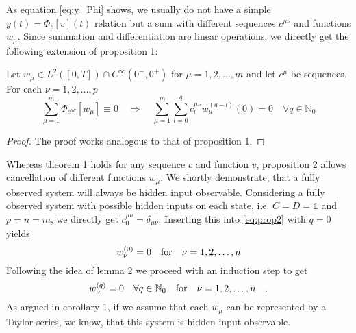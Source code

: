 \clearpage
As equation \eqref{eq:y_Phi} shows, we usually do not have a simple $y(t)=\Phi_c[v](t)$ 
relation but a sum with different sequences $c^{\mu\nu}$ and functions $w_\mu$. Since 
summation and differentiation are linear operations, we directly get the following 
extension of proposition 1:
\begin{proposition}{}{}
	Let $w_\mu\in L^2([0,T])\cap C^\infty(0^-,0^+)$ for $\mu=1,2,\ldots , m$ and let 
	$c^\mu$ be sequences. For each $\nu=1,2,\ldots , p$
	\begin{equation}
	\sum\limits_{\mu=1}^m \Phi_{c^{\mu\nu}}[w_\mu] \equiv 0 \quad \Rightarrow \quad 
	\sum\limits_{\mu=1}^m\sum\limits_{l=0}^q c^{\mu\nu}_l w_\mu^{(q-l)}(0) = 0 \quad 
	\forall q \in \mathbb{N}_0 \tag{$\star\star$} \label{eq:prop2}
 	\end{equation}
\end{proposition}
\begin{proof}
	The proof works analogous to that of proposition 1.
\end{proof}

Whereas theorem 1 holds for any sequence $c$ and function $v$, proposition 2 allows 
cancellation of different functions $w_\mu$. We shortly demonstrate, that a fully 
observed system will always be hidden input observable.
Considering a fully observed system with possible hidden inputs on each state, i.e. 
$C=D=\mathbb{1}$ and $p=n=m$, we directly get $c_0^{\mu\nu}=\delta_{\mu\nu}$. 
Inserting this into 
\eqref{eq:prop2} with $q=0$ yields 
\begin{equation}
w_\nu^{(0)} = 0 \quad \text{for} \quad \nu = 1,2,\ldots , n
\end{equation}
Following the idea of lemma 2 we proceed with an induction step to get
\begin{equation}
w_\nu^{(q)} = 0 \quad \forall q\in\mathbb{N}_0 \quad \text{for} \quad \nu = 1,2,\ldots , n \quad .
\end{equation}
As argued in corollary 1, if we assume that each $w_\mu$ can be represented by a 
Taylor series, we know, that this system is hidden input observable.
